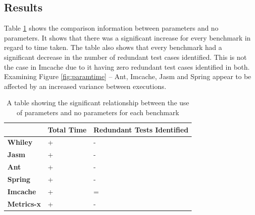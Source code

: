 \subsection{Results}
 Table \ref{parametersig} shows the comparison information between parameters and no parameters. It shows that there was a significant increase for every benchmark in regard to time taken. The table also shows that every benchmark had a significant decrease in the number of redundant test cases identified. This is not the case in Imcache due to it having zero redundant test cases identified in both. Examining Figure \ref{fig:paramtime} -- Ant, Imcache, Jasm and Spring appear to be affected by an increased variance between executions.
 
\begin{table}[h]
\centering
\begin{tabular}{|l|l|l|}
\hline
{\bf }          & {\bf Total Time} & {\bf Redundant Tests Identified} \\ \hline
{\bf Whiley}    & +                & -                           \\ \hline
{\bf Jasm}      & +               & -                          \\ \hline
{\bf Ant}       & +                & -                           \\ \hline
{\bf Spring}    & +                & -                           \\ \hline
{\bf Imcache}   & +                & =                           \\ \hline
{\bf Metrics-x} & +                & -                           \\ \hline
\end{tabular}
\caption{A table showing the significant relationship between the use of parameters and no parameters for each benchmark}
\label{parametersig}
\end{table}

